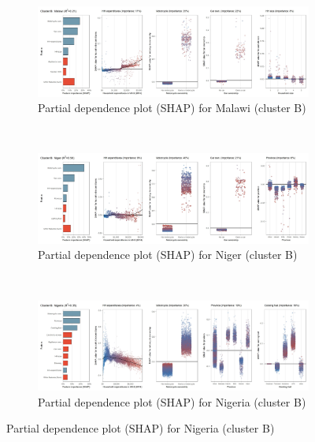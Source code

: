 \begin{figure}[ht!]\ContinuedFloat
    \centering
   \begin{subfigure}[b]{\textwidth}
    \centering
         \caption{Partial dependence plot (SHAP) for Malawi (cluster B)}
         \label{fig:5b_MWI}
         \includegraphics[width=\textwidth]{Figure 5b/Figure_5b_MWI}
         \end{subfigure}
    \\
    \vspace{0.5cm}
   \begin{subfigure}[b]{\textwidth}
    \centering
         \caption{Partial dependence plot (SHAP) for Niger (cluster B)}
         \label{fig:5b_NER}
         \includegraphics[width=\textwidth]{Figure 5b/Figure_5b_NER} 
         \end{subfigure}
    \\
    \vspace{0.5cm}
   \begin{subfigure}[b]{\textwidth}
   \centering
         \caption{Partial dependence plot (SHAP) for Nigeria (cluster B)}
         \label{fig:5b_NGA}
         \includegraphics[width=\textwidth]{Figure 5b/Figure_5b_NGA}
         \end{subfigure}

\end{figure}
